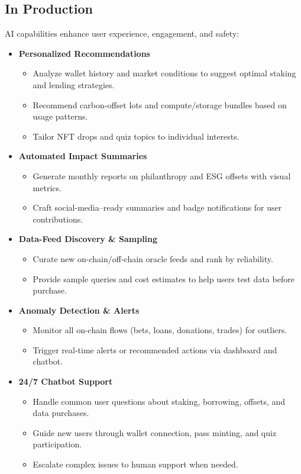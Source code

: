 \documentclass[13pt]{extarticle}
\begin{document}
\subsection{In Production}
AI capabilities enhance user experience, engagement, and safety:
\begin{itemize}[left=1em]
  \item \textbf{Personalized Recommendations}
    \begin{itemize}[left=1.2em]
      \item Analyze wallet history and market conditions to suggest optimal staking and lending strategies.
      \item Recommend carbon-offset lots and compute/storage bundles based on usage patterns.
      \item Tailor NFT drops and quiz topics to individual interests.
    \end{itemize}
  \item \textbf{Automated Impact Summaries}
    \begin{itemize}[left=1.2em]
      \item Generate monthly reports on philanthropy and ESG offsets with visual metrics.
      \item Craft social-media–ready summaries and badge notifications for user contributions.
    \end{itemize}
  \item \textbf{Data-Feed Discovery \& Sampling}
    \begin{itemize}[left=1.2em]
      \item Curate new on-chain/off-chain oracle feeds and rank by reliability.
      \item Provide sample queries and cost estimates to help users test data before purchase.
    \end{itemize}
  \item \textbf{Anomaly Detection \& Alerts}
    \begin{itemize}[left=1.2em]
      \item Monitor all on-chain flows (bets, loans, donations, trades) for outliers.
      \item Trigger real-time alerts or recommended actions via dashboard and chatbot.
    \end{itemize}
  \item \textbf{24/7 Chatbot Support}
    \begin{itemize}[left=1.2em]
      \item Handle common user questions about staking, borrowing, offsets, and data purchases.
      \item Guide new users through wallet connection, pass minting, and quiz participation.
      \item Escalate complex issues to human support when needed.
    \end{itemize}
\end{itemize}
\end{document}
